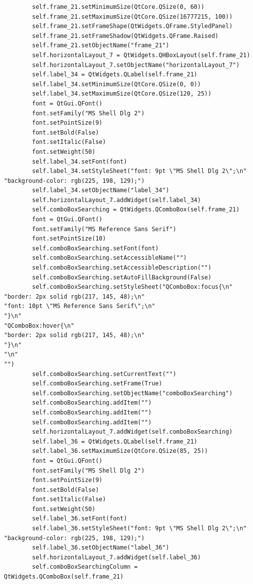 \documentclass[12pt]{article}
\begin{document}
\begin{verbatim}
        self.frame_21.setMinimumSize(QtCore.QSize(0, 60))
        self.frame_21.setMaximumSize(QtCore.QSize(16777215, 100))
        self.frame_21.setFrameShape(QtWidgets.QFrame.StyledPanel)
        self.frame_21.setFrameShadow(QtWidgets.QFrame.Raised)
        self.frame_21.setObjectName("frame_21")
        self.horizontalLayout_7 = QtWidgets.QHBoxLayout(self.frame_21)
        self.horizontalLayout_7.setObjectName("horizontalLayout_7")
        self.label_34 = QtWidgets.QLabel(self.frame_21)
        self.label_34.setMinimumSize(QtCore.QSize(0, 0))
        self.label_34.setMaximumSize(QtCore.QSize(120, 25))
        font = QtGui.QFont()
        font.setFamily("MS Shell Dlg 2")
        font.setPointSize(9)
        font.setBold(False)
        font.setItalic(False)
        font.setWeight(50)
        self.label_34.setFont(font)
        self.label_34.setStyleSheet("font: 9pt \"MS Shell Dlg 2\";\n"
"background-color: rgb(225, 198, 129);")
        self.label_34.setObjectName("label_34")
        self.horizontalLayout_7.addWidget(self.label_34)
        self.comboBoxSearching = QtWidgets.QComboBox(self.frame_21)
        font = QtGui.QFont()
        font.setFamily("MS Reference Sans Serif")
        font.setPointSize(10)
        self.comboBoxSearching.setFont(font)
        self.comboBoxSearching.setAccessibleName("")
        self.comboBoxSearching.setAccessibleDescription("")
        self.comboBoxSearching.setAutoFillBackground(False)
        self.comboBoxSearching.setStyleSheet("QComboBox:focus{\n"
"border: 2px solid rgb(217, 145, 48);\n"
"font: 10pt \"MS Reference Sans Serif\";\n"
"}\n"
"QComboBox:hover{\n"
"border: 2px solid rgb(217, 145, 48);\n"
"}\n"
"\n"
"")
        self.comboBoxSearching.setCurrentText("")
        self.comboBoxSearching.setFrame(True)
        self.comboBoxSearching.setObjectName("comboBoxSearching")
        self.comboBoxSearching.addItem("")
        self.comboBoxSearching.addItem("")
        self.comboBoxSearching.addItem("")
        self.horizontalLayout_7.addWidget(self.comboBoxSearching)
        self.label_36 = QtWidgets.QLabel(self.frame_21)
        self.label_36.setMaximumSize(QtCore.QSize(85, 25))
        font = QtGui.QFont()
        font.setFamily("MS Shell Dlg 2")
        font.setPointSize(9)
        font.setBold(False)
        font.setItalic(False)
        font.setWeight(50)
        self.label_36.setFont(font)
        self.label_36.setStyleSheet("font: 9pt \"MS Shell Dlg 2\";\n"
"background-color: rgb(225, 198, 129);")
        self.label_36.setObjectName("label_36")
        self.horizontalLayout_7.addWidget(self.label_36)
        self.comboBoxSearchingColumn = QtWidgets.QComboBox(self.frame_21)

\end{verbatim}
\end{document}
